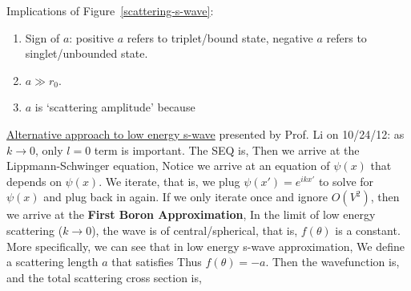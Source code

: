 \documentclass{school-22.101-notes}
\begin{document}
\begin{enumerate}
Implications of Figure~\ref{scattering-s-wave}:
\begin{enumerate}
\item Sign of $a$:  positive $a$ refers to triplet/bound state, negative $a$ refers to singlet/unbounded state. 
\item $a \gg r_0$. 
\item $a$ is `scattering amplitude' because 
\end{enumerate}
\end{enumerate}

\uline{Alternative approach to low energy s-wave} presented by Prof. Li on 10/24/12: as $k\to 0$, only $l=0$ term is important. The SEQ is, 
Then we arrive at the Lippmann-Schwinger equation, 
Notice we arrive at an equation of $\psi(x)$ that depends on $\psi(x)$. We iterate, that is, we plug $\psi(x') = e^{ikx'}$ to solve for $\psi(x)$ and plug back in again. If we only iterate once and ignore $O(V^2)$, then we arrive at the \textbf{First Boron Approximation}, 
In the limit of low energy scattering ($k \to 0$), the wave is of central/spherical, that is, $f(\theta)$ is a constant. More specifically, we can see that in low energy s-wave approximation, 
We define a scattering length $a$ that satisfies 
Thus $f(\theta) = -a$. Then the wavefunction is, 
and the total scattering cross section is,
\end{document}
